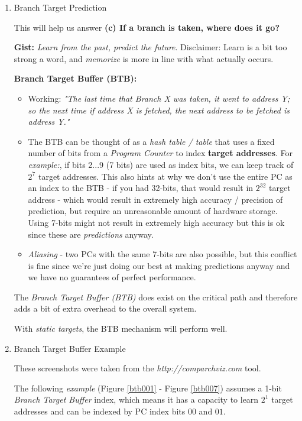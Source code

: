 \documentclass[12pt]{article}
\newenvironment{QandA}{\begin{enumerate}[label=\bfseries\alph*.]\bfseries}
                      {\end{enumerate}}
\newenvironment{answered}{\par\quad\normalfont}{}
\begin{document}
\begin{QandA}
\begin{answered}
\end{answered}

\item Branch Target Prediction
\begin{answered}
This will help us answer \textbf{(c) If a branch is taken, where does it go?}

\textbf{Gist:} \textit{Learn from the past, predict the future}. Disclaimer: Learn is a bit too strong a word, and \textit{memorize} is more in line with what actually occurs.

\textbf{Branch Target Buffer (BTB):}
\begin{itemize}
    \item Working: \textit{"The last time that Branch X was taken, it went to address Y; so the next time if address X is fetched, the next address to be fetched is address Y."}
    \item The BTB can be thought of as a \textit{hash table / table} that uses a fixed number of bits from a \textit{Program Counter} to index \textbf{target addresses}. For \textit{example:}, if bits 2$...$9 (7 bits) are used as index bits, we can keep track of $2^{7}$ target addresses. This also hints at why we don't use the entire PC as an index to the BTB - if you had 32-bits, that would result in $2^{32}$ target address - which would result in extremely high accuracy / precision of prediction, but require an unreasonable amount of hardware storage. Using 7-bits might not result in extremely high accuracy but this is ok since these are \textit{predictions} anyway.
    \item \textit{Aliasing} - two PCs with the same 7-bits are also possible, but this conflict is fine since we're just doing our best at making predictions anyway and we have no guarantees of perfect performance.
\end{itemize}

The \textit{Branch Target Buffer (BTB)} does exist on the critical path and therefore adds a bit of extra overhead to the overall system. 

With \textit{static targets}, the BTB mechanism will perform well.
\end{answered}

\item Branch Target Buffer Example
\begin{answered}
These screenshots were taken from the \textit{http://comparchviz.com} tool.

The following \textit{example} (Figure \ref{btb001} - Figure \ref{btb007}) assumes a 1-bit \textit{Branch Target Buffer} index, which means it has a capacity to learn $2^{1}$ target addresses and can be indexed by PC index bits $00$ and $01$.


\end{answered}
\end{QandA}
\end{document}
